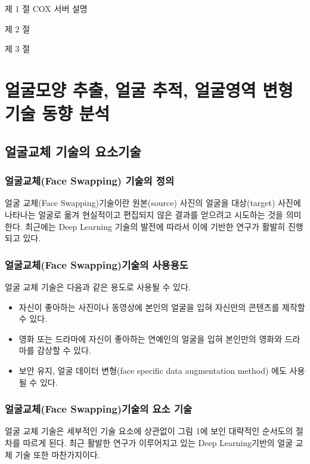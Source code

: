 \documentclass{oblivoir}
\begin{document}
제  1  절 COX 서버 설명

제  2  절 

제  3  절 

\chapter{얼굴모양 추출, 얼굴 추적, 얼굴영역 변형 기술 동향 분석 }

\section{얼굴교체 기술의 요소기술}

\subsection{ 얼굴교체(Face Swapping) 기술의 정의}

얼굴 교체(Face Swapping)기술이란 원본(source) 사진의 얼굴을 대상(target) 사진에 나타나는 얼굴로 옮겨 현실적이고 편집되지 않은 결과를 얻으려고 시도하는 것을 의미한다. 최근에는 Deep Learning 기술의 발전에 따라서 이에 기반한 연구가 활발히 진행되고 있다.

\subsection{ 얼굴교체(Face Swapping)기술의 사용용도}

얼굴 교체 기술은 다음과 같은 용도로 사용될 수 있다.

\begin{itemize}
    \item 자신이 좋아하는 사진이나 동영상에 본인의 얼굴을 입혀 자신만의 콘텐츠를 제작할 수 있다.
    \item 영화 또는 드라마에 자신이 좋아하는 연예인의 얼굴을 입혀 본인만의 영화와 드라마를 감상할 수 있다.
    \item 보안 유지, 얼굴 데이터 변형(face specific data augmentation method) 에도 사용될 수 있다.
\end{itemize}

\subsection{ 얼굴교체(Face Swapping)기술의 요소 기술}

얼굴 교체 기술은 세부적인 기술 요소에 상관없이 그림 1에 보인 대략적인 순서도의 절차를 따르게 된다. 최근 활발한 연구가 이루어지고 있는 Deep Learning기반의 얼굴 교체 기술 또한 마찬가지이다. 
\end{document}
